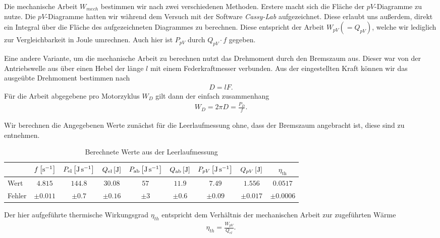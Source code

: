 Die mechanische Arbeit $W_{mech}$ bestimmen wir nach zwei verschiedenen Methoden. Erstere macht sich die Fläche der $pV$-Diagramme zu nutze. Die $pV$-Diagramme hatten wir während dem Versuch mit der Software \textit{Cassy-Lab} aufgezeichnet. Diese erlaubt uns außerdem, direkt ein Integral über die Fläche des aufgezeichneten Diagrammes zu berechnen. Diese entspricht der Arbeit $W_{pV} (= Q_{pV})$, welche wir lediglich zur Vergleichbarkeit in Joule umrechnen. Auch hier ist $P_{pV}$ durch $Q_{pV}\cdot f$ gegeben.

Eine andere Variante, um die mechanische Arbeit zu berechnen nutzt das Drehmoment durch den Bremszaum aus. Dieser war von der Antriebswelle aus über einen Hebel der länge $l$ mit einem Federkraftmesser verbunden. Aus der eingestellten Kraft können wir das ausgeübte Drehmoment bestimmen nach
\begin{align}
    D = l F.
\end{align}
Für die Arbeit abgegebene pro Motorzyklus $W_D$ gilt dann der einfach zusammenhang
\begin{align}
    W_D = 2 \pi D = \frac{P_D}{f}.
\end{align}

Wir berechnen die Angegebenen Werte zunächst für die Leerlaufmessung ohne, dass der Bremszaum angebracht ist, diese sind  zu entnehmen. 

\begin{table}[h!]
    \centering
    \begin{tabular}{l | c | c | c | c | c | c | c | c}
    \textbf{} & \boldmath$f\,\qty[\si{\per\second}]$ & \boldmath$P_{\text{el}}\,\qty[\si{\joule\per\second}]$ & \boldmath$Q_{\text{el}}\,\qty[\si{\joule}]$ & \boldmath$P_{\text{ab}}\,\qty[\si{\joule\per\second}]$ & \boldmath$Q_{\text{ab}}\,\qty[\si{\joule}]$ & \boldmath$P_{pV}\,\qty[\si{\joule\per\second}]$ & \boldmath$Q_{pV}\,\qty[\si{\joule}]$ & \boldmath$\eta_{\text{th}}$ \\\hline
    Wert & $4.815$ & $144.8$ & $30.08$ & $57$ & $11.9$ & $7.49$ & $1.556$ & $0.0517$ \\\hline
    Fehler & $\pm 0.011$ & $\pm 0.7$ & $\pm 0.16$ & $\pm 3$ & $\pm 0.6$ & $\pm 0.09$ & $\pm 0.017$ & $\pm 0.0006$ \\
    \end{tabular}
    \caption{Berechnete Werte aus der Leerlaufmessung}
    \label{tab:werte_leerlauf}
\end{table}

Der hier aufgeführte thermische Wirkungsgrad $\eta_{th}$ entspricht dem Verhältnis der mechanischen Arbeit zur zugeführten Wärme
\begin{align}
    \eta_{th} = \frac{W_{pV}}{Q_{el}}.
\end{align}

